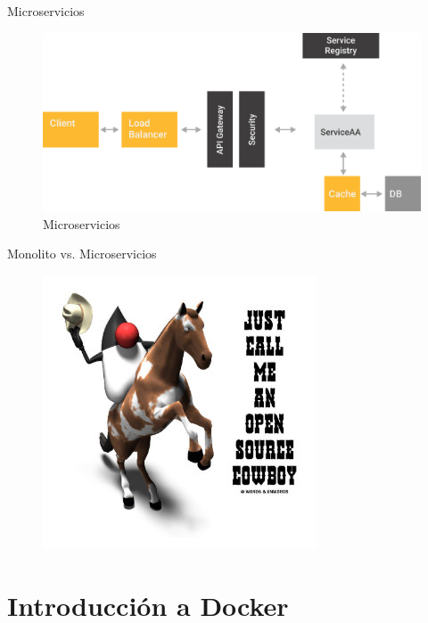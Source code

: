 \documentclass[aspectratio=169]{beamer}
\begin{document}
\begin{frame}{Microservicios}
    \begin{figure}
        \centering
        \includegraphics[width=0.7\linewidth]{Images/microservicios}
        \caption{Microservicios}
    \end{figure}
\end{frame}

\begin{frame}{Monolito vs. Microservicios}
    \begin{figure}
        \centering
        \includegraphics[width=0.6\linewidth]{Images/dukecowboy}
    \end{figure}
\end{frame}


{
    \section{Introducción a Docker}
}
\end{document}
